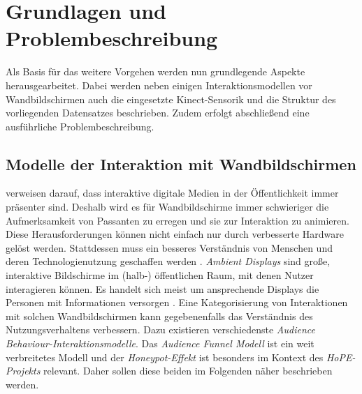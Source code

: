 \chapter{Grundlagen und Problembeschreibung}
\label{chapter2}
Als Basis für das weitere Vorgehen
werden nun grundlegende Aspekte herausgearbeitet.
Dabei werden neben einigen Interaktionsmodellen vor Wandbildschirmen
auch die eingesetzte Kinect-Sensorik und die Struktur des vorliegenden Datensatzes beschrieben.
Zudem erfolgt abschließend eine ausführliche Problembeschreibung.

\section{Modelle der Interaktion mit Wandbildschirmen}
\label{2-ModelleInteraktion-Wandbildschirme}
\citep{wouters_uncovering_2016} verweisen darauf, dass interaktive digitale Medien in der Öffentlichkeit immer präsenter sind.
Deshalb wird es für Wandbildschirme immer schwieriger die Aufmerksamkeit von Passanten zu erregen
und sie zur Interaktion zu animieren.
Diese Herausforderungen können nicht einfach nur durch verbesserte Hardware gelöst werden.
Stattdessen muss ein besseres Verständnis von Menschen und deren Technologienutzung geschaffen werden \citep{wouters_uncovering_2016}.
\emph{Ambient Displays} sind große, interaktive Bildschirme im (halb-) öffentlichen Raum, mit denen Nutzer interagieren können.
Es handelt sich meist um ansprechende Displays die Personen mit Informationen versorgen \citep{mankoff_heuristic_2003}.
Eine Kategorisierung von Interaktionen mit solchen Wandbildschirmen kann gegebenenfalls das Verständnis des Nutzungsverhaltens verbessern.
Dazu existieren verschiedenste \emph{Audience Behaviour-Interaktionsmodelle}.
Das \emph{Audience Funnel Modell} ist ein weit verbreitetes Modell
und der \emph{Honeypot-Effekt} ist besonders im Kontext des \emph{HoPE-Projekts} relevant.
Daher sollen diese beiden im Folgenden näher beschrieben werden.


